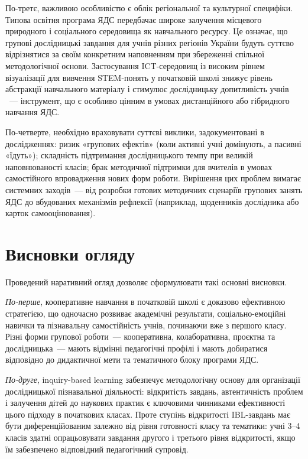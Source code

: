 \documentclass[a4paper,14pt]{extarticle}
\begin{document}
По-третє, важливою особливістю є облік регіональної та культурної специфіки. Типова освітня програма ЯДС передбачає широке залучення місцевого природного і соціального середовища як навчального ресурсу. Це означає, що групові дослідницькі завдання для учнів різних регіонів України будуть суттєво відрізнятися за своїм конкретним наповненням при збереженні спільної методологічної основи. Застосування ICT-середовищ із високим рівнем візуалізації для вивчення STEM-понять у початковій школі знижує рівень абстракції навчального матеріалу і стимулює дослідницьку допитливість учнів \parencite{Fanchamps2023102}~--- інструмент, що є особливо цінним в умовах дистанційного або гібридного навчання ЯДС.

По-четверте, необхідно враховувати суттєві виклики, задокументовані в дослідженнях: ризик «групових ефектів» (коли активні учні домінують, а пасивні «їдуть»); складність підтримання дослідницького темпу при великій наповнюваності класів; брак методичної підтримки для вчителів в умовах самостійного впровадження нових форм роботи. Вирішення цих проблем вимагає системних заходів~--- від розробки готових методичних сценаріїв групових занять ЯДС до вбудованих механізмів рефлексії (наприклад, щоденників дослідника або карток самооцінювання).

\newpage

\section*{Висновки огляду}

Проведений наративний огляд дозволяє сформулювати такі основні висновки.

\textit{По-перше}, кооперативне навчання в початковій школі є доказово ефективною стратегією, що одночасно розвиває академічні результати, соціально-емоційні навички та пізнавальну самостійність учнів, починаючи вже з першого класу. Різні форми групової роботи~--- кооперативна, колаборативна, проєктна та дослідницька~--- мають відмінні педагогічні профілі і мають добиратися відповідно до дидактичної мети та тематичного блоку програми ЯДС.

\textit{По-друге}, inquiry-based learning забезпечує методологічну основу для організації дослідницької пізнавальної діяльності: відкритість завдань, автентичність проблем і залучення дітей до наукових практик є ключовими чинниками ефективності цього підходу в початкових класах. Проте ступінь відкритості IBL-завдань має бути диференційованим залежно від рівня готовності класу та тематики: учні 3--4 класів здатні опрацьовувати завдання другого і третього рівня відкритості, якщо їм забезпечено відповідний педагогічний супровід.
\end{document}
